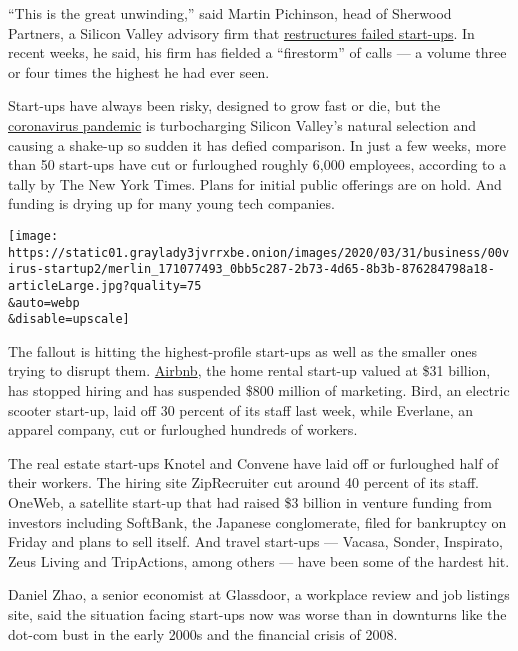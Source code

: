 ``This is the great unwinding,'' said Martin Pichinson, head of Sherwood
Partners, a Silicon Valley advisory firm that
\href{https://www.nytimes3xbfgragh.onion/2003/05/04/business/a-new-technology-now-that-new-is-old.html?searchResultPosition=4}{restructures
failed start-ups}. In recent weeks, he said, his firm has fielded a
``firestorm'' of calls --- a volume three or four times the highest he
had ever seen.

Start-ups have always been risky, designed to grow fast or die, but the
\href{https://www.nytimes3xbfgragh.onion/news-event/coronavirus?action=click\&pgtype=Article\&state=default\&module=styln-coronavirus\&variant=show\&region=TOP_BANNER\&context=storyline_menu}{coronavirus
pandemic} is turbocharging Silicon Valley's natural selection and
causing a shake-up so sudden it has defied comparison. In just a few
weeks, more than 50 start-ups have cut or furloughed roughly 6,000
employees, according to a tally by The New York Times. Plans for initial
public offerings are on hold. And funding is drying up for many young
tech companies.

\texttt{[image: https://static01.graylady3jvrrxbe.onion/images/2020/03/31/business/00virus-startup2/merlin\_171077493\_0bb5c287-2b73-4d65-8b3b-876284798a18-articleLarge.jpg?quality=75\\\&auto=webp\\\&disable=upscale]}

The fallout is hitting the highest-profile start-ups as well as the
smaller ones trying to disrupt them.
\href{https://www.nytimes3xbfgragh.onion/2020/03/10/technology/airbnb-hosts-coronavirus.html}{Airbnb},
the home rental start-up valued at \$31 billion, has stopped hiring and
has suspended \$800 million of marketing. Bird, an electric scooter
start-up, laid off 30 percent of its staff last week, while Everlane, an
apparel company, cut or furloughed hundreds of workers.

The real estate start-ups Knotel and Convene have laid off or furloughed
half of their workers. The hiring site ZipRecruiter cut around 40
percent of its staff. OneWeb, a satellite start-up that had raised \$3
billion in venture funding from investors including SoftBank, the
Japanese conglomerate, filed for bankruptcy on Friday and plans to sell
itself. And travel start-ups --- Vacasa, Sonder, Inspirato, Zeus Living
and TripActions, among others --- have been some of the hardest hit.

Daniel Zhao, a senior economist at Glassdoor, a workplace review and job
listings site, said the situation facing start-ups now was worse than in
downturns like the dot-com bust in the early 2000s and the financial
crisis of 2008.

